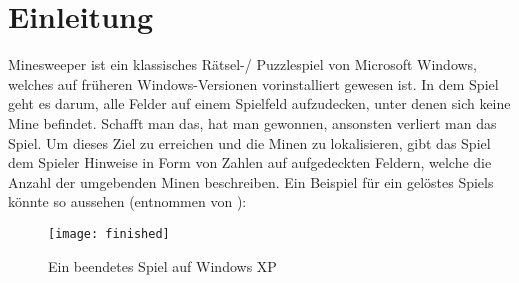 %
\graphicspath{{chapters/images/}}
\section{Einleitung}
Minesweeper ist ein klassisches Rätsel-/ Puzzlespiel von Microsoft Windows, welches auf früheren Windows-Versionen
vorinstalliert gewesen ist. In dem Spiel geht es darum, alle Felder auf einem Spielfeld aufzudecken, unter denen
sich keine Mine befindet. Schafft man das, hat man gewonnen, ansonsten verliert man das Spiel. Um dieses Ziel zu
erreichen und die Minen zu lokalisieren, gibt das Spiel dem Spieler Hinweise in Form von Zahlen auf aufgedeckten
Feldern, welche die Anzahl der umgebenden Minen beschreiben. Ein Beispiel für ein gelöstes Spiels könnte so aussehen (entnommen von \cite{MS}):

\begin{figure}[!htb]
    \centering
    \texttt{[image: finished]}
    \caption{Ein beendetes Spiel auf Windows XP}\label{finished}
\end{figure}